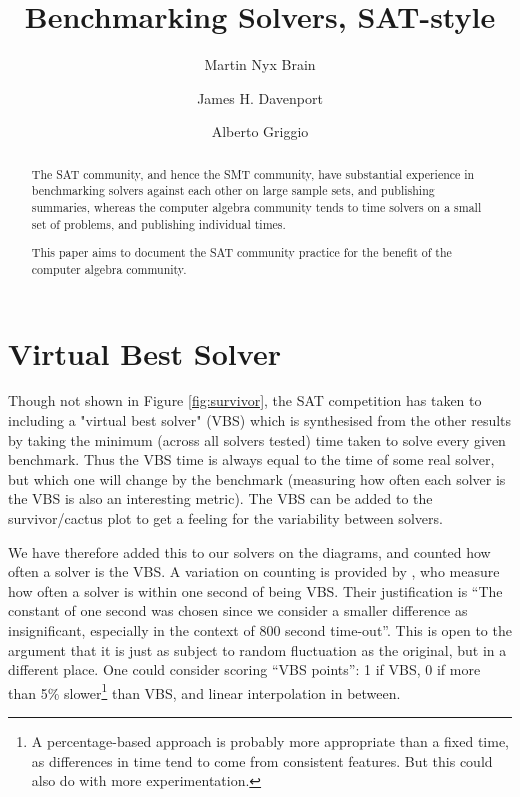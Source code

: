 \documentclass{easychair}
\begin{document}
\title{Benchmarking Solvers, SAT-style}
\author{Martin Nyx Brain \and James H. Davenport \and Alberto Griggio}
\maketitle
\begin{abstract}\noindent
The SAT community, and hence the SMT community, have substantial experience in benchmarking solvers against each other on large sample sets, and publishing summaries, whereas the computer algebra community tends to time solvers on a small set of problems, and publishing individual times.
\par
This paper aims to document the SAT community practice for the benefit of the computer algebra community.
\end{abstract}

\section{Virtual Best Solver}
Though not shown in  Figure  \ref{fig:survivor}, the SAT competition has taken to including a "virtual best solver" (VBS)
which is synthesised from the other results by taking the minimum (across all solvers tested) time taken to solve every given benchmark.
Thus the VBS time is always equal to the time of some real solver, but which one will change by the benchmark (measuring how often each solver is the VBS is also an interesting metric).  The VBS can be added to the survivor/cactus plot to get a feeling for the variability between solvers.
\par
We have therefore added this to our solvers on the diagrams, and counted how often a solver is the VBS. A variation on counting is provided by \cite{Janotaetal2016a}, who measure how often a solver is within one second of being VBS. Their justification is ``The constant of one second was chosen since we consider a smaller difference as insignificant, especially in the context of 800 second time-out''.
This is open to the argument that it is just as subject to random fluctuation as the original, but in a different place. One could consider scoring ``VBS points'': 1 if VBS, 0 if more than 5\% slower\footnote{A percentage-based approach is probably more appropriate than a fixed time, as differences in time tend to come from consistent features. But this could also do with more experimentation.} than VBS, and linear  interpolation in between.
\end{document}
